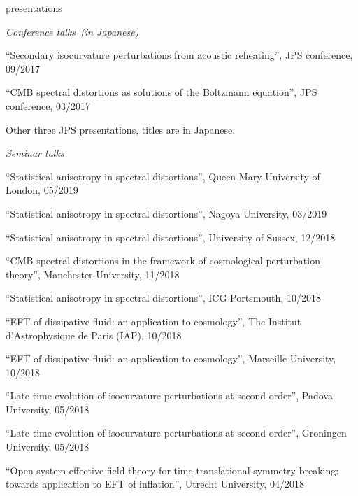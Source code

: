 \documentclass[a4paper]{resume} %
\begin{document}
\begin{rSection}{presentations}
\begin{etaremune}
        
\end{etaremune}

\noindent\textit{Conference talks~(in Japanese)}

\begin{etaremune}
    \item 
    ``Secondary isocurvature perturbations from acoustic reheating'', JPS conference, 09/2017
    \item
    ``CMB spectral distortions as solutions of the Boltzmann equation'', JPS conference, 03/2017
    \item
    Other three JPS presentations, titles are in Japanese.
\end{etaremune}


\noindent\textit{Seminar talks}

\begin{etaremune}

	\item
    ``Statistical anisotropy in spectral distortions'', Queen Mary University of London, 05/2019
	\item
    ``Statistical anisotropy in spectral distortions'', Nagoya University, 03/2019
    \item
    ``Statistical anisotropy in spectral distortions'', University of Sussex, 12/2018
    \item
    ``CMB spectral distortions in the framework of cosmological perturbation theory'', Manchester University, 11/2018
    
    \item
    ``Statistical anisotropy in spectral distortions'', ICG Portsmouth, 10/2018

    \item
    ``EFT of dissipative fluid: an application to cosmology'', The Institut d'Astrophysique de Paris (IAP), 10/2018

    \item
    ``EFT of dissipative fluid: an application to cosmology'', Marseille University, 10/2018

    \item
    ``Late time evolution of isocurvature perturbations at second order'', Padova University, 05/2018

    \item
    ``Late time evolution of isocurvature perturbations at second order'', Groningen University, 05/2018

    \item
    ``Open system effective field theory for time-translational symmetry breaking: towards application to EFT of inflation'', Utrecht University, 04/2018


\end{etaremune}
\end{rSection}
\end{document}
